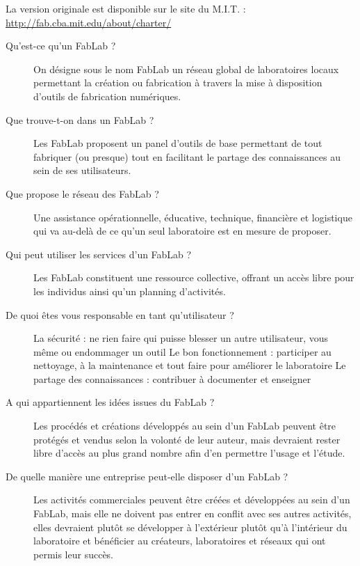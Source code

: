 {\small \begin{center}
La version originale est disponible sur le site du M.I.T. : \\ \url{http://fab.cba.mit.edu/about/charter/}
\end{center}}
\begin{description}
  \item[Qu'est-ce qu'un FabLab ?]
On désigne sous le nom FabLab un réseau global de laboratoires locaux permettant la création ou fabrication à travers la mise à disposition d'outils de fabrication numériques.

\item[Que trouve-t-on dans un FabLab ?]
Les FabLab proposent un panel d'outils de base permettant de tout fabriquer (ou presque) tout en facilitant le partage des connaissances au sein de ses utilisateurs.

\item[Que propose le réseau des FabLab ?]
Une assistance opérationnelle, éducative, technique, financière et logistique qui va au-delà de ce qu'un seul laboratoire est en mesure de proposer.

\item[Qui peut utiliser les services d'un FabLab ?]
Les FabLab constituent une ressource collective, offrant un accès libre pour les individus ainsi qu'un planning d'activités.

\item[De quoi êtes vous responsable en tant qu'utilisateur ?]
La sécurité : ne rien faire qui puisse blesser un autre utilisateur, vous même ou endommager un outil
Le bon fonctionnement : participer au nettoyage, à la maintenance et tout faire pour améliorer le laboratoire
Le partage des connaissances : contribuer à documenter et enseigner

\item[A qui appartiennent les idées issues du FabLab ?]
Les procédés et créations développés au sein d'un FabLab peuvent être protégés et vendus selon la volonté de leur auteur, mais devraient rester libre d'accès au plus grand nombre afin d'en permettre l'usage et l'étude.

\item[De quelle manière une entreprise peut-elle disposer d'un FabLab ?]
Les activités commerciales peuvent être créées et développées au sein d'un FabLab, mais elle ne doivent pas entrer en conflit avec ses autres activités, elles devraient plutôt se développer à l'extérieur plutôt qu'à l'intérieur du laboratoire et bénéficier au créateurs, laboratoires et réseaux qui ont permis leur succès.
\end{description}
